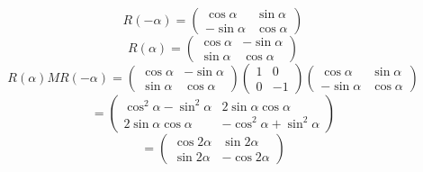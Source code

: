 \documentclass{jsarticle}
\begin{document}
   $$ R(-\alpha) = \begin{pmatrix} \cos \alpha & \sin \alpha \\
   - \sin \alpha & \cos \alpha \end{pmatrix} $$
   $$ R(\alpha) = \begin{pmatrix} \cos \alpha & - \sin \alpha \\
   \sin \alpha & \cos \alpha \end{pmatrix} $$
   $$ R(\alpha)M R(-\alpha) = 
   \begin{pmatrix} \cos \alpha & - \sin \alpha \\
   \sin \alpha & \cos \alpha \end{pmatrix} \begin{pmatrix} 1 & 0 \\
   0 & - 1 \end{pmatrix} \begin{pmatrix} \cos \alpha & \sin \alpha \\
   - \sin \alpha & \cos \alpha \end{pmatrix} $$
   $$ = \begin{pmatrix} \cos^2 \alpha - \sin^2 \alpha & 2 \sin \alpha \cos 
	   \alpha \\
	   2 \sin \alpha \cos \alpha & - \cos^2 \alpha + \sin^2 \alpha
   \end{pmatrix} $$
   $$ = \begin{pmatrix} \cos 2 \alpha & \sin 2 \alpha \\
   \sin 2 \alpha & - \cos 2 \alpha \end{pmatrix} $$
\end{document}
